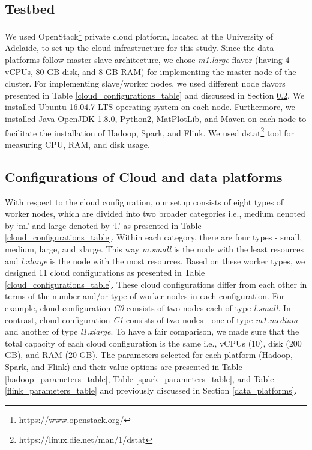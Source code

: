 \documentclass[3p]{elsarticle}
\begin{document}
\subsection{Testbed} We used OpenStack\footnote{https://www.openstack.org/} private cloud platform, located at the University of Adelaide, to set up the cloud infrastructure for this study. Since the data platforms follow master-slave architecture, we chose \textit{m1.large} flavor (having 4 vCPUs, 80 GB disk, and 8 GB RAM) for implementing the master node of the cluster. For implementing slave/worker nodes, we used different node flavors presented in Table \ref{cloud_configurations_table} and discussed in Section \ref{cloud_platform_configurations}. We installed Ubuntu 16.04.7 LTS operating system on each node. Furthermore, we installed Java OpenJDK 1.8.0, Python2, MatPlotLib, and Maven on each node to facilitate the installation of Hadoop, Spark, and Flink. We used dstat\footnote{https://linux.die.net/man/1/dstat} tool for measuring CPU, RAM, and disk usage. 

\subsection{Configurations of Cloud and data platforms}\label{cloud_platform_configurations} With respect to the cloud configuration, our setup consists of eight types of worker nodes, which are divided into two broader categories i.e., medium denoted by ‘m.’ and large denoted by ‘l.’ as presented in Table \ref{cloud_configurations_table}. Within each category, there are four types - small, medium, large, and xlarge. This way \textit{m.small} is the node with the least resources and \textit{l.xlarge} is the node with the most resources. Based on these worker types, we designed 11 cloud configurations as presented in Table \ref{cloud_configurations_table}. These cloud configurations differ from each other in terms of the number and/or type of worker nodes in each configuration. For example, cloud configuration \textit{C0} consists of two nodes each of type \textit{l.small}. In contrast, cloud configuration \textit{C1} consists of two nodes - one of type \textit{m1.medium} and another of type \textit{l1.xlarge}. To have a fair comparison, we made sure that the total capacity of each cloud configuration is the same i.e., vCPUs (10), disk (200 GB), and RAM (20 GB). The parameters selected for each platform (Hadoop, Spark, and Flink) and their value options are presented in Table \ref{hadoop_parameters_table}, Table \ref{spark_parameters_table}, and Table \ref{flink_parameters_table} and previously discussed in Section \ref{data_platforms}. 
\end{document}

